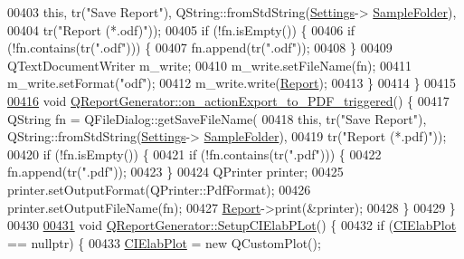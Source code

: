 \begin{DoxyCode}
{{00403       \textcolor{keyword}{this}, tr(\textcolor{stringliteral}{"Save Report"}), QString::fromStdString(\hyperlink{class_q_report_generator_a5e75a3f9447c0c24b32cd198a00af21c}{Settings}->
      \hyperlink{class_soil_analyzer_1_1_soil_settings_adfd46a349d927988c955fa064fc7bf1a}{SampleFolder}),
00404       tr(\textcolor{stringliteral}{"Report (*.odf)"}));
00405   \textcolor{keywordflow}{if} (!fn.isEmpty()) \{
00406     \textcolor{keywordflow}{if} (!fn.contains(tr(\textcolor{stringliteral}{".odf"}))) \{
00407       fn.append(tr(\textcolor{stringliteral}{".odf"}));
00408     \}
00409     QTextDocumentWriter m\_write;
00410     m\_write.setFileName(fn);
00411     m\_write.setFormat(\textcolor{stringliteral}{"odf"});
00412     m\_write.write(\hyperlink{class_q_report_generator_ab051048608bc51151bc0b1ffc217f292}{Report});
00413   \}
00414 \}
00415 
\hypertarget{qreportgenerator_8cpp_source_l00416}{}\hyperlink{class_q_report_generator_aa170226241deb861a964ac722c8e4564}{00416} \textcolor{keywordtype}{void} \hyperlink{class_q_report_generator_aa170226241deb861a964ac722c8e4564}{QReportGenerator::on\_actionExport\_to\_PDF\_triggered}()
       \{
00417   QString fn = QFileDialog::getSaveFileName(
00418       \textcolor{keyword}{this}, tr(\textcolor{stringliteral}{"Save Report"}), QString::fromStdString(\hyperlink{class_q_report_generator_a5e75a3f9447c0c24b32cd198a00af21c}{Settings}->
      \hyperlink{class_soil_analyzer_1_1_soil_settings_adfd46a349d927988c955fa064fc7bf1a}{SampleFolder}),
00419       tr(\textcolor{stringliteral}{"Report (*.pdf)"}));
00420   \textcolor{keywordflow}{if} (!fn.isEmpty()) \{
00421     \textcolor{keywordflow}{if} (!fn.contains(tr(\textcolor{stringliteral}{".pdf"}))) \{
00422       fn.append(tr(\textcolor{stringliteral}{".pdf"}));
00423     \}
00424     QPrinter printer;
00425     printer.setOutputFormat(QPrinter::PdfFormat);
00426     printer.setOutputFileName(fn);
00427     \hyperlink{class_q_report_generator_ab051048608bc51151bc0b1ffc217f292}{Report}->print(&printer);
00428   \}
00429 \}
00430 
\hypertarget{qreportgenerator_8cpp_source_l00431}{}\hyperlink{class_q_report_generator_a828ae557a03162a08d13f94f2d1888f4}{00431} \textcolor{keywordtype}{void} \hyperlink{class_q_report_generator_a828ae557a03162a08d13f94f2d1888f4}{QReportGenerator::SetupCIElabPLot}() \{
00432   \textcolor{keywordflow}{if} (\hyperlink{class_q_report_generator_a1a727308ea8cb98523a308d10da70b39}{CIElabPlot} == \textcolor{keyword}{nullptr}) \{
00433       \hyperlink{class_q_report_generator_a1a727308ea8cb98523a308d10da70b39}{CIElabPlot} = \textcolor{keyword}{new} QCustomPlot();
}}
\end{DoxyCode}
